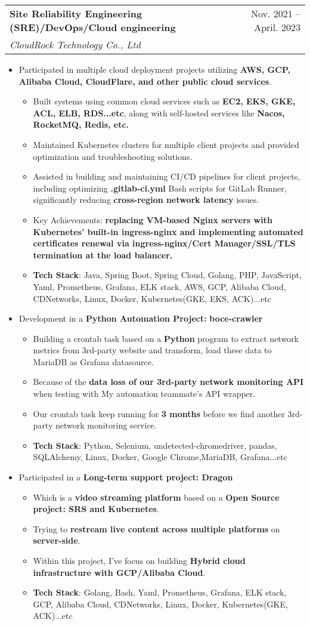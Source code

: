 \documentclass[letterpaper,11pt]{article}
\makeatletter
\newcommand{\resumeItem}[1]{
  \item\small{
    {#1 \vspace{-1pt}}
  }
}
\newcommand{\resumeSubheading}[4]{
  \vspace{-1pt}\item
    \begin{tabular*}{\textwidth}[t]{l@{\extracolsep{\fill}}r}
      \textbf{#1} & {\color{dark-grey}\small #2}\vspace{1pt}\\ %
      \textit{#3} & {\color{dark-grey} \small #4}\\ %
    \end{tabular*}\vspace{-4pt}
}
\newcommand{\resumeSubItem}[1]{
  \begin{itemize}
    \item \small{#1 \vspace{-1pt}}
  \end{itemize}
}
\newcommand{\resumeItemListStart}{\begin{itemize}}
\newcommand{\resumeItemListEnd}{\end{itemize}\vspace{0pt}}
\makeatother
\begin{document}
  \resumeSubheading
  {Site Reliability Engineering (SRE)/DevOps/Cloud engineering}{Nov. 2021 -- April. 2023}
  {CloudRock Technology Co., Ltd}{}  
  \resumeItemListStart
    \resumeItem{Participated in multiple cloud deployment projects utilizing \textbf{AWS, GCP, Alibaba Cloud, CloudFlare, and other public cloud services}.}      
      \resumeSubItem{Built systems using common cloud services such as \textbf{EC2, EKS, GKE, ACL, ELB, RDS...etc}, along with self-hosted services like \textbf{Nacos, RocketMQ, Redis, etc.}}      
      \resumeSubItem{Maintained Kubernetes clusters for multiple client projects and provided optimization and troubleshooting solutions.}
      \resumeSubItem{Assisted in building and maintaining CI/CD pipelines for client projects, including optimizing \textbf{.gitlab-ci.yml} Bash scripts for GitLab Runner, significantly reducing \textbf{cross-region network latency} issues.}
      \resumeSubItem{Key Achievements: \textbf{replacing VM-based Nginx servers with Kubernetes' built-in ingress-nginx and implementing automated certificates renewal via ingress-nginx/Cert Manager/SSL/TLS termination at the load balancer.}}
      \resumeSubItem{\textbf{Tech Stack}: Java, Spring Boot, Spring Cloud, Golang, PHP, JavaScript, Yaml, Prometheus, Grafana, ELK stack, AWS, GCP, Alibaba Cloud, CDNetworks, Linux, Docker, Kubernetes(GKE, EKS, ACK)...etc}
    \resumeItem{Development in a \textbf{Python Automation Project:} \textbf{boce-crawler}}
      \resumeSubItem{Building a crontab task based on a \textbf{Python} program to extract network metrics from 3rd-party website and transform, load these data to MariaDB as Grafana datasource.}
      \resumeSubItem{Because of the \textbf{data loss of our 3rd-party network monitoring API}  when testing with My automation teammate's API wrapper.}
      \resumeSubItem{Our crontab task keep running for \textbf{3 months} before we find another 3rd-party network monitoring service.}
      \resumeSubItem{\textbf{Tech Stack}: Python, Selenium, undetected-chromedriver, pandas, SQLAlchemy, Linux, Docker, Google Chrome,MariaDB, Grafana...etc}    
    \resumeItem{Participated in a \textbf{Long-term support project: Dragon}}
      \resumeSubItem{Which is a \textbf{video streaming platform} based on a \textbf{Open Source project: SRS and Kubernetes}.}
      \resumeSubItem{Trying to \textbf{restream live content across multiple platforms} on \textbf{server-side}.}
      \resumeSubItem{Within this project, I've focus on building \textbf{Hybrid cloud infrastructure with GCP/Alibaba Cloud}.}
      \resumeSubItem{\textbf{Tech Stack}: Golang, Bash, Yaml, Prometheus, Grafana, ELK stack, GCP, Alibaba Cloud, CDNetworks, Linux, Docker, Kubernetes(GKE, ACK)...etc}
  \resumeItemListEnd
\end{document}
